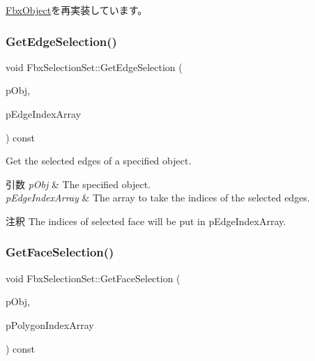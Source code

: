 \hyperlink{class_fbx_object_ad44f814323dc1b5e78bff1bfc608b4bb}{Fbx\+Object}を再実装しています。

\mbox{\label{class_fbx_selection_set_a1c3c07b58ae08bf77ce044be79dff6c4}} 
\subsubsection{\texorpdfstring{Get\+Edge\+Selection()}{GetEdgeSelection()}}
{\footnotesize\ttfamily void Fbx\+Selection\+Set\+::\+Get\+Edge\+Selection (\begin{DoxyParamCaption}\item[{\hyperlink{class_fbx_object}{Fbx\+Object} $\ast$}]{p\+Obj,  }\item[{\hyperlink{class_fbx_array}{Fbx\+Array}$<$ int $>$ \&}]{p\+Edge\+Index\+Array }\end{DoxyParamCaption}) const}

Get the selected edges of a specified object. 
\begin{DoxyParams}{引数}
{\em p\+Obj} & The specified object. \\
\hline
{\em p\+Edge\+Index\+Array} & The array to take the indices of the selected edges. \\
\hline
\end{DoxyParams}
\begin{DoxyRemark}{注釈}
The indices of selected face will be put in p\+Edge\+Index\+Array. 
\end{DoxyRemark}
\mbox{\label{class_fbx_selection_set_ae304339bd66b4edca36c3f74517cb762}} 
\subsubsection{\texorpdfstring{Get\+Face\+Selection()}{GetFaceSelection()}}
{\footnotesize\ttfamily void Fbx\+Selection\+Set\+::\+Get\+Face\+Selection (\begin{DoxyParamCaption}\item[{\hyperlink{class_fbx_object}{Fbx\+Object} $\ast$}]{p\+Obj,  }\item[{\hyperlink{class_fbx_array}{Fbx\+Array}$<$ int $>$ \&}]{p\+Polygon\+Index\+Array }\end{DoxyParamCaption}) const}

